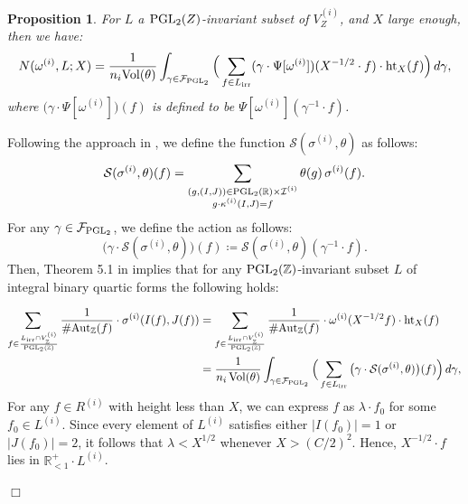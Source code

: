 \documentclass{article}
\def\Z{{\mathbb Z}}
\def\PGL{{\rm PGL}}
\def\Aut{{\rm Aut}}
\def\irr{{\rm irr}}
\def\Vol{{\rm Vol}}
\def\Z{{\mathbb Z}}
\def \h{{\rm ht}}
\newtheorem{proposition}[theorem]{Proposition}
\newenvironment{proof}{\noindent {\bf Proof:}}{$\Box$ \vspace{2 ex}}
\begin{document}
\begin{proposition}
For $L$ a $\PGL_2(Z)$-invariant subset of $V_{Z}^{(i)}$, and $X$ large enough, then we have:
\begin{equation}\label{Bahargava-avaraging-smooth}
    N(\omega^{(i)}, L;X) = \frac{1}{n_i \Vol(\theta)}\int_{\gamma \in \mathcal{F}_{\PGL_2}}  \Big( \sum_{f \in L_{\irr}} (\gamma \cdot \Psi[\omega^{(i)}])(X^{-1/2} \cdot f) \cdot \h_{X}(f)\Big) \, d\gamma, 
\end{equation}
where $\big(\gamma \cdot \Psi[\omega^{(i)}]\big)(f)$ is defined to be $\Psi[\omega^{(i)}](\gamma^{-1} \cdot f)$.
\end{proposition}
\begin{proof}
Following the approach in \cite{moment}, we define the function $\mathcal{S}(\sigma^{(i)}, \theta)$ as follows:
\begin{equation*}
    \mathcal{S}(\sigma^{(i)}, \theta)(f) =   \sum _{\substack{(g,(I,J)) \in \PGL_2(\mathbb{R}) \times \mathcal{I}^{(i)} \\  g \cdot \kappa^{(i)}(I, J) = f }} \theta(g) \, \sigma^{(i)}(f).
\end{equation*}
 For any $\gamma \in \mathcal{F}_{\PGL_2}$, we define the action as follows:
\begin{equation*}
\big(\gamma \cdot \mathcal{S}(\sigma^{(i)}, \theta)\big)(f) \coloneqq \mathcal{S}(\sigma^{(i)}, \theta)(\gamma^{-1} \cdot f).
\end{equation*}
Then, Theorem 5.1 in \cite{moment} implies that for any $\PGL_2(\mathbb{Z})$-invariant subset $L$ of integral binary quartic forms the following holds:

\begin{equation*}
\begin{split}
\sum_{f \in \frac{L_{\irr} \cap V_{\Z}^{(i)}}{\PGL_2(\mathbb{Z})}} \frac{1}{\#\Aut_{\mathbb{Z}}(f)} \cdot \sigma^{(i)}(I(f),J(f)) &=  \sum_{f \in \frac{L_{\irr} \cap V_{\Z}^{(i)}}{\PGL_2(\mathbb{Z})}} \frac{1}{\#\Aut_{\mathbb{Z}}(f)} \cdot \omega^{(i)}(X^{-1/2} f) \cdot \h_{X}(f)\\
&=\frac{1}{n_i \, \Vol(\theta)}\int_{\gamma \in \mathcal{F}_{\PGL_2}}  \Big( \sum_{f \in L_{\irr}}  \big(\gamma \cdot \mathcal{S}(\sigma^{(i)}, \theta)\big)(f) \Big) \, d\gamma,
\end{split}
\end{equation*}
For any $f \in R^{(i)}$ with height less than $X$, we can express $f$ as $\lambda \cdot f_0$ for some $f_0 \in L^{(i)}$. Since every element of $L^{(i)}$ satisfies either $|I(f_0)| = 1$ or $|J(f_0)| = 2$, it follows that $\lambda < X^{1/2}$ whenever $X > (C/2)^2$. Hence, $X^{-1/2} \cdot f$ lies in $\mathbb{R}^{+}_{<1} \cdot L^{(i)}$.


\end{proof}
\end{document}
